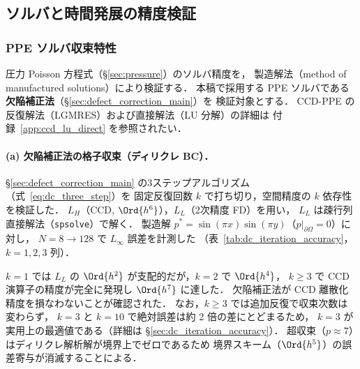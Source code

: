 %
\subsection{ソルバと時間発展の精度検証}
\label{sec:verify_solver}

\subsubsection{PPE ソルバ収束特性}
\label{sec:verify_ppe}

圧力 Poisson 方程式（§\ref{sec:pressure}）のソルバ精度を，
製造解法（method of manufactured solutions）により検証する．
本稿で採用する PPE ソルバである\textbf{欠陥補正法}（§\ref{sec:defect_correction_main}）を
検証対象とする．
CCD-PPE の反復解法（LGMRES）および直接解法（LU 分解）の詳細は
付録~\ref{app:ccd_lu_direct} を参照されたい．

\paragraph{(a) 欠陥補正法の格子収束（ディリクレ BC）．}

§\ref{sec:defect_correction_main} の3ステップアルゴリズム（式~\eqref{eq:dc_three_step}）を
固定反復回数 $k$ で打ち切り，空間精度の $k$ 依存性を検証した．
$L_H$（CCD, $\Ord{h^6}$），$L_L$（2次精度 FD）を用い，
$L_L$ は疎行列直接解法（\texttt{spsolve}）で解く．
製造解 $p^* = \sin(\pi x)\sin(\pi y)$（$p|_{\partial\Omega}=0$）に対し，
$N = 8 \to 128$ で $L_\infty$ 誤差を計測した
（表~\ref{tab:dc_iteration_accuracy}，$k=1,2,3$ 列）．

$k=1$ では $L_L$ の $\Ord{h^2}$ が支配的だが，$k=2$ で $\Ord{h^4}$，
$k \geq 3$ で CCD 演算子の精度が完全に発現し $\Ord{h^7}$ に達した．
欠陥補正法が CCD 離散化精度を損なわないことが確認された．
なお，$k \geq 3$ では追加反復で収束次数は変わらず，
$k=3$ と $k=10$ で絶対誤差は約 2 倍の差にとどまるため，
$k=3$ が実用上の最適値である（詳細は §\ref{sec:dc_iteration_accuracy}）．
超収束（$p \approx 7$）はディリクレ解析解が境界上でゼロであるため
境界スキーム（$\Ord{h^5}$）の誤差寄与が消滅することによる．

